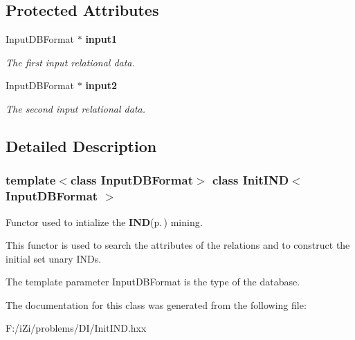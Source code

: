 \subsection*{Protected Attributes}
\begin{CompactItemize}
\item 
Input\-DBFormat $\ast$ {\bf input1}\label{class_init_i_n_d_88db2dbdbc7fe5e373e386583e1ed0cb}

\begin{CompactList}\small\item\em The first input relational data. \item\end{CompactList}\item 
Input\-DBFormat $\ast$ {\bf input2}\label{class_init_i_n_d_29f5e69e0cb428a4bcccf69b63331294}

\begin{CompactList}\small\item\em The second input relational data. \item\end{CompactList}\end{CompactItemize}


\subsection{Detailed Description}
\subsubsection*{template$<$class Input\-DBFormat$>$ class Init\-IND$<$ Input\-DBFormat $>$}

Functor used to intialize the {\bf IND}{\rm (p.\,\pageref{class_i_n_d})} mining. 

This functor is used to search the attributes of the relations and to construct the initial set unary INDs.

The template parameter Input\-DBFormat is the type of the database. 



The documentation for this class was generated from the following file:\begin{CompactItemize}
\item 
F:/i\-Zi/problems/DI/Init\-IND.hxx\end{CompactItemize}
